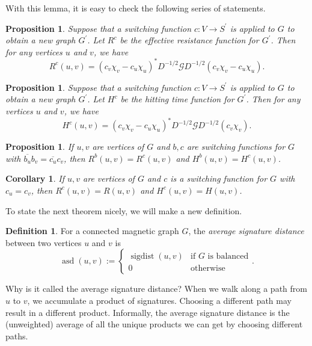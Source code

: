 \documentclass[12pt]{article}
\newtheorem{prop}[thm]{Proposition}
\newtheorem{corollary}[thm]{Corollary}
\theoremstyle{definition}
\newtheorem{defn}[thm]{Definition}
\DeclareMathOperator{\sigdist}{sigdist}
\DeclareMathOperator{\asd}{asd}
\newcommand{\green}{\mathcal{G}}
\begin{document}
With this lemma, it is easy to check the following series of statements.

\begin{prop}
Suppose that a switching function $c: V \rightarrow S^\prime$ is applied to $G$ to obtain a new graph $G^\prime$. Let $R^c$ be the effective resistance function for $G^\prime$. Then for any vertices $u$ and $v$, we have $$R^c(u, v) = (c_v \chi_v - c_u \chi_u)^* D^{-1/2} \green D^{-1/2} (c_v \chi_v - c_u \chi_u).$$
\end{prop}

\begin{prop}
Suppose that a switching function $c: V \rightarrow S^\prime$ is applied to $G$ to obtain a new graph $G^\prime$. Let $H^c$ be the hitting time function for $G^\prime$. Then for any vertices $u$ and $v$, we have $$H^c(u, v) = (c_v \chi_v - c_u \chi_u)^* D^{-1/2} \green D^{-1/2} (c_v \chi_v).$$
\end{prop}

\begin{prop}
If $u, v$ are vertices of $G$ and $b, c$ are switching functions for $G$ with $\overline{b_u}b_v = \overline{c_u}c_v$, then $R^b (u, v) = R^c (u, v)$ and $H^b (u, v) = H^c (u, v)$.
\end{prop}

\begin{corollary}
If $u, v$ are vertices of $G$ and $c$ is a switching function for $G$ with $c_u = c_v$, then $R^c (u, v) = R(u, v)$ and $H^c (u, v) = H(u, v)$.  
\end{corollary}

To state the next theorem nicely, we will make a new definition.   
\begin{defn}
For a connected magnetic graph $G$, the \textit{average signature distance} between two vertices $u$ and $v$ is
$$
\asd(u, v) := \begin{cases}
\sigdist(u, v) &\mbox{if $G$ is balanced} \\
0 &\mbox{otherwise}
\end{cases}.
$$
\end{defn}
Why is it called the average signature distance? When we walk along a path from $u$ to $v$, we accumulate a product of signatures. Choosing a different path may result in a different product. Informally, the average signature distance is the (unweighted) average of all the unique products we can get by choosing different paths.
\end{document}
